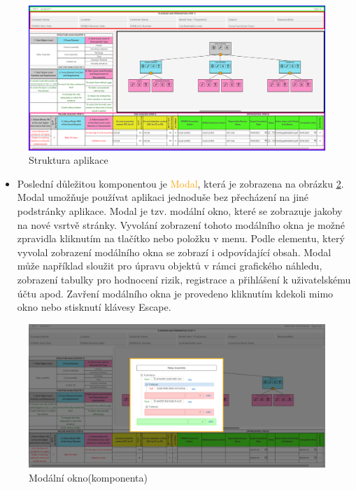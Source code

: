 \begin{itemize}
\end{itemize}

\begin{figure}[t]
\centering
	\includegraphics[width=1.0\textwidth]{Figures/componenty2P.png}
	\caption{Struktura aplikace}
	\label{fig:structure}
\end{figure}

\begin{itemize}
    \item Poslední důležitou komponentou je \textcolor{orange}{Modal}, která je zobrazena na obrázku \ref{fig:modal}. Modal umožňuje používat aplikaci jednoduše bez přecházení na jiné podstránky aplikace. Modal je tzv. modální okno, které se zobrazuje jakoby na nové vsrtvě stránky. Vyvolání zobrazení tohoto modálního okna je možné zpravidla kliknutím na tlačítko nebo položku v menu. Podle elementu, který vyvolal zobrazení modálního okna se zobrazí i odpovídající obsah. Modal může například sloužit pro úpravu objektů v rámci grafického náhledu, zobrazení tabulky pro hodnocení rizik, registrace a přihlášení k uživatelskému účtu apod. Zavření modálního okna je provedeno kliknutím kdekoli mimo okno nebo stisknutí klávesy Escape. 
\end{itemize}
\begin{figure}[t]
\centering
	\includegraphics[width=1.0\textwidth]{Figures/modalP.png}
	\caption{Modální okno(komponenta)}
	\label{fig:modal}
\end{figure}

